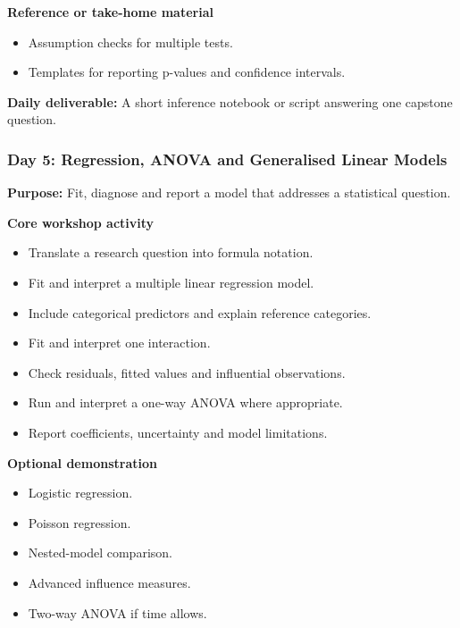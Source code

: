 \documentclass[11pt]{article}
\providecommand{\tightlist}{%
  \setlength{\itemsep}{0pt}\setlength{\parskip}{0pt}}
\begin{document}
\textbf{Reference or take-home material}

\begin{itemize}
\tightlist
\item
  Assumption checks for multiple tests.
\item
  Templates for reporting p-values and confidence intervals.
\end{itemize}

\textbf{Daily deliverable:} A short inference notebook or script
answering one capstone question.

\hypertarget{day-5-regression-anova-and-generalised-linear-models}{%
\subsubsection{Day 5: Regression, ANOVA and Generalised Linear
Models}\label{day-5-regression-anova-and-generalised-linear-models}}

\textbf{Purpose:} Fit, diagnose and report a model that addresses a
statistical question.

\textbf{Core workshop activity}

\begin{itemize}
\tightlist
\item
  Translate a research question into formula notation.
\item
  Fit and interpret a multiple linear regression model.
\item
  Include categorical predictors and explain reference categories.
\item
  Fit and interpret one interaction.
\item
  Check residuals, fitted values and influential observations.
\item
  Run and interpret a one-way ANOVA where appropriate.
\item
  Report coefficients, uncertainty and model limitations.
\end{itemize}

\textbf{Optional demonstration}

\begin{itemize}
\tightlist
\item
  Logistic regression.
\item
  Poisson regression.
\item
  Nested-model comparison.
\item
  Advanced influence measures.
\item
  Two-way ANOVA if time allows.
\end{itemize}
\end{document}
